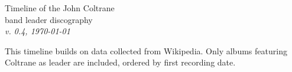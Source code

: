 \documentclass[a4paper, landscape]{article}
\newcounter{timelineend}
\newlength\legendx
\newcommand\makethelegend{
\small
    \node at (\legendx, 4.3) 
        [legend, align=right, anchor=north east] (recorddatelegend) 
        {First recording date} ;

    \node at (recorddatelegend.north east) 
        [legend, align=right, anchor=south east] 
        {Release year\\(if other than first rec.)};

    \node at (\legendx, 3.65) [legend, anchor=east] {*\,=\,live};

        \def\nodecolor{black}

    \node at (\legendx, 3) [anchor=north east] {Album};

    \node at (\legendx, 2) [legend, anchor=north east] (albumlegend) {Record label} ;

    \foreach \l/\c in 
        {Prestige/red,
        Blue~Note/blue,
        Impulse!/orange,
        Atlantic/green,
        Posthumous~release/purple}
        {
            \node at (albumlegend.south east) 
                [inner sep=1.5pt, legend, rounded corners, draw=\c!40, fill=\c!10, anchor=north east]
                (albumlegend) {\l\vphantom{jk}};
        }

        \node at (\legendx, -1.5) 
            [anchor=east]
            {Personell};

        \node at (\legendx,-4)
            [legend, anchor=east, align=right]
            {Other\\recording\\dates};
}
\begin{document}
\thispagestyle{empty}

\begin{minipage}[t]{.4\textwidth}
{\huge Timeline of the John Coltrane\\[.5ex]band leader discography}\\[\medskipamount]
\textit{v. 0.4, \today}
\end{minipage}
\hfill
\begin{minipage}[t]{.38\textwidth}
\large
This timeline builds on data collected from Wikipedia. Only albums featuring Coltrane as leader are included, ordered by first recording date.
\end{minipage}


\vfill

\center


\end{document}
